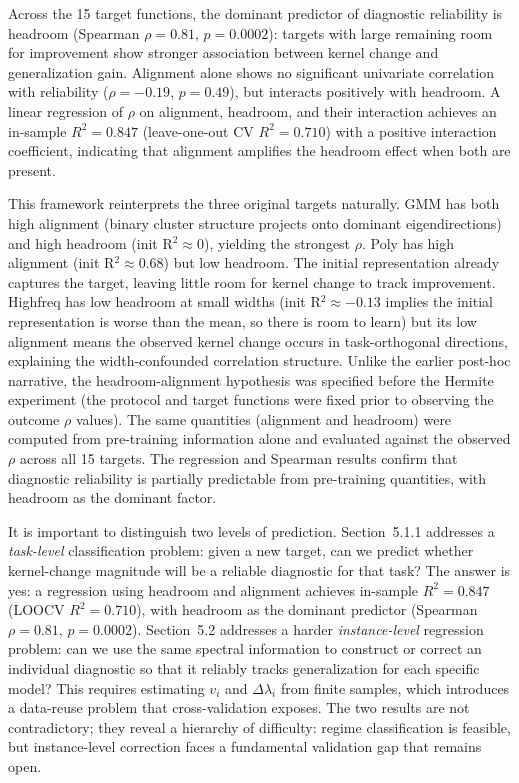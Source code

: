 \documentclass[10pt]{article}
\begin{document}
Across the 15 target functions, the dominant predictor of diagnostic reliability is headroom (Spearman $\rho=0.81$, $p=0.0002$): targets with large remaining room for improvement show stronger association between kernel change and generalization gain. Alignment alone shows no significant univariate correlation with reliability ($\rho=-0.19$, $p=0.49$), but interacts positively with headroom. A linear regression of $\rho$ on alignment, headroom, and their interaction achieves an in-sample $R^2=0.847$ (leave-one-out CV $R^2=0.710$) with a positive interaction coefficient, indicating that alignment amplifies the headroom effect when both are present.

This framework reinterprets the three original targets naturally. GMM has both high alignment (binary cluster structure projects onto dominant eigendirections) and high headroom (init R$^2\approx0$), yielding the strongest $\rho$. Poly has high alignment (init R$^2\approx0.68$) but low headroom. The initial representation already captures the target, leaving little room for kernel change to track improvement. Highfreq has low headroom at small widths (init R$^2\approx-0.13$ implies the initial representation is worse than the mean, so there is room to learn) but its low alignment means the observed kernel change occurs in task-orthogonal directions, explaining the width-confounded correlation structure. Unlike the earlier post-hoc narrative, the headroom-alignment hypothesis was specified before the Hermite experiment (the protocol and target functions were fixed prior to observing the outcome $\rho$ values). The same quantities (alignment and headroom) were computed from pre-training information alone and evaluated against the observed $\rho$ across all 15 targets. The regression and Spearman results confirm that diagnostic reliability is partially predictable from pre-training quantities, with headroom as the dominant factor.

It is important to distinguish two levels of prediction. Section~5.1.1 addresses a \emph{task-level} classification problem: given a new target, can we predict whether kernel-change magnitude will be a reliable diagnostic for that task? The answer is yes: a regression using headroom and alignment achieves in-sample $R^2=0.847$ (LOOCV $R^2=0.710$), with headroom as the dominant predictor (Spearman $\rho=0.81$, $p=0.0002$). Section~5.2 addresses a harder \emph{instance-level} regression problem: can we use the same spectral information to construct or correct an individual diagnostic so that it reliably tracks generalization for each specific model? This requires estimating $v_i$ and $\Delta\lambda_i$ from finite samples, which introduces a data-reuse problem that cross-validation exposes. The two results are not contradictory; they reveal a hierarchy of difficulty: regime classification is feasible, but instance-level correction faces a fundamental validation gap that remains open.
\end{document}
